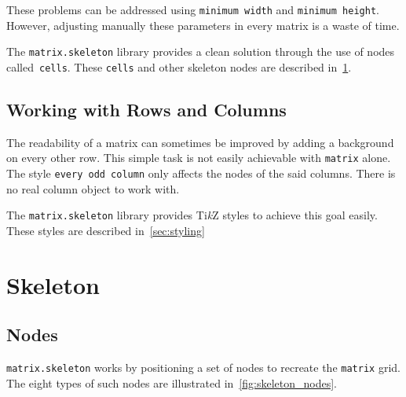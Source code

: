 \documentclass{scrartcl}
\newcommand\code\texttt
\newcommand{\TikZ}{Ti\textit{k}Z\xspace}
\begin{document}
These problems can be addressed using \code{minimum width} and \code{minimum height}.
However, adjusting manually these parameters in every matrix is a waste of time.

The \code{matrix.skeleton} library provides a clean solution through the use of nodes called~\code{cells}.
These \code{cells} and other skeleton nodes are described in~\cref{sec:skeleton}.

\subsection{Working with Rows and Columns}

The readability of a matrix can sometimes be improved by adding a background on every other row.
This simple task is not easily achievable with \code{matrix} alone.
The style \code{every odd column} only affects the nodes of the said columns.
There is no real column object to work with.

The \code{matrix.skeleton} library provides \TikZ styles to achieve this goal easily.
These styles are described in~\cref{sec:styling}

\section{Skeleton}
\label{sec:skeleton}

\subsection{Nodes}

\code{matrix.skeleton} works by positioning a set of nodes to recreate the \code{matrix} grid.
The eight types of such nodes are illustrated in~\cref{fig:skeleton_nodes}.
\end{document}
